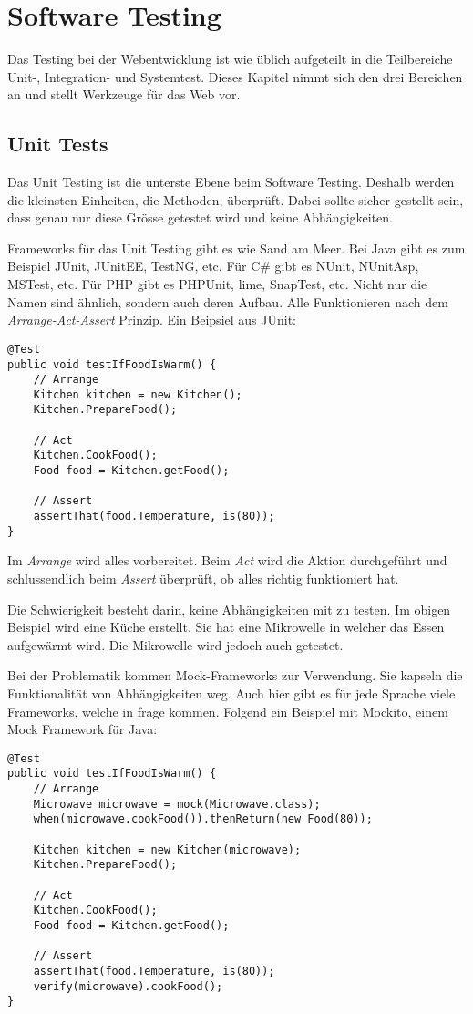 \chapter{Software Testing}
Das Testing bei der Webentwicklung ist wie üblich aufgeteilt in die Teilbereiche Unit-, Integration- und Systemtest. Dieses Kapitel nimmt sich den drei Bereichen an und stellt Werkzeuge für das Web vor.

\section{Unit Tests}
Das Unit Testing ist die unterste Ebene beim Software Testing. Deshalb werden die kleinsten Einheiten, die Methoden, überprüft. Dabei sollte sicher gestellt sein, dass genau nur diese Grösse getestet wird und keine Abhängigkeiten.

Frameworks für das Unit Testing gibt es wie Sand am Meer. Bei Java gibt es zum Beispiel JUnit, JUnitEE, TestNG, etc. Für C\# gibt es NUnit, NUnitAsp, MSTest, etc. Für PHP gibt es PHPUnit, lime, SnapTest, etc. Nicht nur die Namen sind ähnlich, sondern auch deren Aufbau. Alle Funktionieren nach dem \textit{Arrange-Act-Assert} Prinzip. Ein Beipsiel aus JUnit:

\begin{lstlisting}
@Test
public void testIfFoodIsWarm() {
	// Arrange
	Kitchen kitchen = new Kitchen();
	Kitchen.PrepareFood();
	
	// Act
	Kitchen.CookFood();
	Food food = Kitchen.getFood();
	
	// Assert
	assertThat(food.Temperature, is(80));
}
\end{lstlisting}

Im \textit{Arrange} wird alles vorbereitet. Beim \textit{Act} wird die Aktion durchgeführt und schlussendlich beim \textit{Assert} überprüft, ob alles richtig funktioniert hat.

Die Schwierigkeit besteht darin, keine Abhängigkeiten mit zu testen. Im obigen Beispiel wird eine Küche erstellt. Sie hat eine Mikrowelle in welcher das Essen aufgewärmt wird. Die Mikrowelle wird jedoch auch getestet.

Bei der Problematik kommen Mock-Frameworks zur Verwendung. Sie kapseln die Funktionalität von Abhängigkeiten weg. Auch hier gibt es für jede Sprache viele Frameworks, welche in frage kommen. Folgend ein Beispiel mit Mockito, einem Mock Framework für Java:

\begin{lstlisting}
@Test
public void testIfFoodIsWarm() {
	// Arrange
	Microwave microwave = mock(Microwave.class);
	when(microwave.cookFood()).thenReturn(new Food(80));
	
	Kitchen kitchen = new Kitchen(microwave);
	Kitchen.PrepareFood();
	
	// Act
	Kitchen.CookFood();
	Food food = Kitchen.getFood();
	
	// Assert
	assertThat(food.Temperature, is(80));
	verify(microwave).cookFood();
}
\end{lstlisting}

